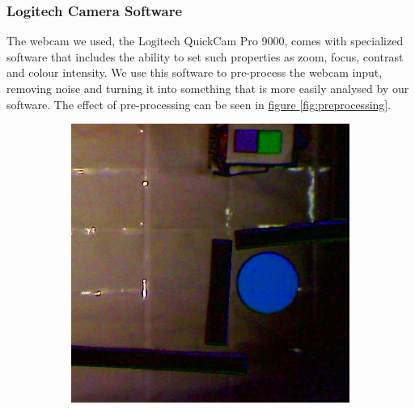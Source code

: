 \documentclass[10pt,twocolumn]{scrartcl}
\newcommand{\fref}[1]{\hyperref[#1]{figure \vref{#1}}}
\begin{document}
\subsubsection{Logitech Camera Software}
The webcam we used, the Logitech QuickCam Pro 9000, comes with specialized software that includes the ability to set such properties as zoom, focus, contrast and colour intensity. We use this software to pre-process the webcam input, removing noise and turning it into something that is more easily analysed by our software. The effect of pre-processing can be seen in \fref{fig:preprocessing}.

\begin{figure}
	\centering
	\begin{subfigure}[t]{0.45\columnwidth}
	\centering
	\includegraphics[width=\columnwidth]{pictures/preprocessing1.png}
	\end{subfigure}
	\begin{subfigure}[t]{0.45\columnwidth}
	\centering

\end{subfigure}
\end{figure}
\end{document}
